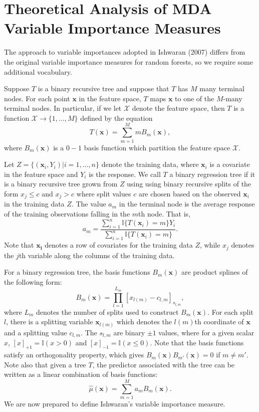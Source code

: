 \documentclass[12pt,twoside]{reedthesis}
\theoremstyle{definition}
\theoremstyle{definition}
\theoremstyle{definition}
\theoremstyle{remark}
\begin{document}
\section{Theoretical Analysis of MDA Variable Importance
Measures}\label{theoretical-analysis-of-mda-variable-importance-measures}

The approach to variable importances adopted in Ishwaran (2007) differs
from the original variable importance measures for random forests, so we
require some additional vocabulary.

Suppose \(T\) is a binary recursive tree and suppose that \(T\) has
\(M\) many terminal nodes. For each point \(\mathbf{x}\) in the feature
space, \(T\) maps \(\mathbf{x}\) to one of the \(M\)-many terminal
nodes. In particular, if we let \(\mathcal{X}\) denote the feature
space, then \(T\) is a function
\(\mathcal{X}\rightarrow \{1,\ldots, M\}\) defined by the equation
\[T(\mathbf{x})=\sum_{m=1}^M m B_m(\mathbf{x}),\] where
\(B_m(\mathbf{x})\) is a \(0-1\) basis function which partition the
feature space \(\mathcal{X}\).

Let \(Z=\{(\mathbf{x}_i,Y_i)|i=1,\ldots,n\}\) denote the training data,
where \(\mathbf{x}_i\) is a covariate in the feature space and \(Y_i\)
is the response. We call \(T\) a binary regression tree if it is a
binary recursive tree grown from \(Z\) using using binary recursive
splits of the form \(x_j\leq c\) and \(x_j> c\) where split values \(c\)
are chosen based on the observed \(\mathbf{x}_i\) in the training data
\(Z\). The value \(a_m\) in the terminal node is the average response of
the training observations falling in the \(m\)th node. That is,
\[a_m=\frac{\sum_{i=1}^n \mathbb{I}\{T(\mathbf{x}_i)=m\} Y_i}{\sum_{i=1}^n \mathbb{I}\{T(\mathbf{x}_i)=m\}}.\]
Note that \(\mathbf{x_i}\) denotes a row of covariates for the training
data \(Z\), while \(x_j\) denotes the \(j\)th variable along the columns
of the training data.

For a binary regression tree, the basis functions \(B_m(\mathbf{x})\)
are product splines of the following form:
\[B_m(\mathbf{x})=\prod_{l = 1}^{L_m} [x_{l(m)}-c_{l, m}]_{s_{l,m}},\]
where \(L_m\) denotes the number of splits used to construct
\(B_m(\mathbf{x})\). For each split \(l\), there is a splitting variable
\(\mathbf{x}_{l(m)}\) which denotes the \(l(m)\)th coordinate of
\(\mathbf{x}\) and a splitting value \(c_{l,m}\). The \(s_{l,m}\) are
binary \(\pm 1\) values, where for a given scalar \(x\),
\([x]_{+1}=\mathbb{I}(x>0)\) and \([x]_{-1}=\mathbb{I}(x\leq 0).\) Note
that the basis functions satisfy an orthogonality property, which gives
\(B_m(\mathbf{x})B_{m'}(\mathbf{x})=0\) if \(m\neq m'\). Note also that
given a tree \(T\), the predictor associated with the tree can be
written as a linear combination of basis functions:
\[\hat{\mu}(\mathbf{x})=\sum_{m=1}^M a_m B_m(\mathbf{x}).\] We are now
prepared to define Ishwaran's variable importance measure.
\end{document}
